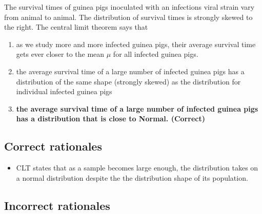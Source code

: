 \documentclass[letterpaper,9pt,twoside,printwatermark=false]{pinp}
\providecommand{\tightlist}{%
  \setlength{\itemsep}{0pt}\setlength{\parskip}{0pt}}
\begin{document}
The survival times of guinea pigs inoculated with an infections viral
strain vary from animal to animal. The distribution of survival times is
strongly skewed to the right. The central limit theorem says that

\begin{enumerate}
\def\labelenumi{\alph{enumi})}
\tightlist
\item
  as we study more and more infected guinea pigs, their average survival
  time gets ever closer to the mean \(\mu\) for all infected guinea
  pigs.
\item
  the average survival time of a large number of infected guinea pigs
  has a distribution of the same shape (strongly skewed) as the
  distribution for individual infected guinea pigs
\item
  \textbf{the average survival time of a large number of infected guinea
  pigs has a distribution that is close to Normal. (Correct)}
\end{enumerate}

\subsection{Correct rationales}\label{correct-rationales-4}

\begin{itemize}
\tightlist
\item
  CLT states that as a sample becomes large enough, the distribution
  takes on a normal distribution despite the the distribution shape of
  its population.
\end{itemize}

\subsection{Incorrect rationales}\label{incorrect-rationales-4}





\end{document}
